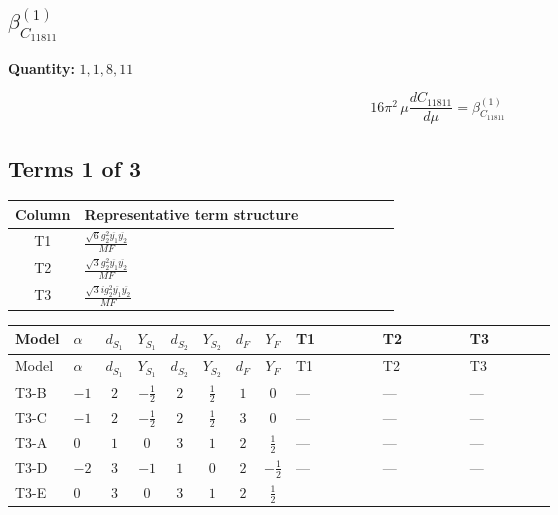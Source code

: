 \documentclass[8pt]{article}
\begin{document}
\begin{landscape}
\section*{$\beta_{C_{11811}}^{(1)}$}
\noindent\textbf{Quantity: }$\mathrm{1,1,8,11}$\par\smallskip
\[16\pi^2\,\mu\frac{d C_{11811}}{d\mu}=\beta_{C_{11811}}^{(1)}\]
\subsection*{Terms 1 of 3}
\begin{center}
\begin{tabular}{@{}c >{\raggedright\arraybackslash}p{0.82\linewidth}@{}}
\toprule
Column & Representative term structure \\
\midrule
T1 & \(\displaystyle \frac{\sqrt{6} g_{2}^{2} \overline{y_{1}} \overline{y_{2}}}{MF}\) \\
\midrule
T2 & \(\displaystyle \frac{\sqrt{3} g_{2}^{2} \overline{y_{1}} \overline{y_{2}}}{MF}\) \\
\midrule
T3 & \(\displaystyle \frac{\sqrt{3} i g_{2}^{2} \overline{y_{1}} \overline{y_{2}}}{MF}\) \\
\midrule
\bottomrule
\end{tabular}
\end{center}
\smallskip
\tiny
\begin{longtable}{@{}llcccccc >{\raggedright\arraybackslash}p{0.21\linewidth} >{\raggedright\arraybackslash}p{0.21\linewidth} >{\raggedright\arraybackslash}p{0.21\linewidth}@{}}
\toprule
Model & $\alpha$ & $d_{S_1}$ & $Y_{S_1}$ & $d_{S_2}$ & $Y_{S_2}$ & $d_F$ & $Y_F$ & T1 & T2 & T3 \\
\midrule
\endfirsthead
\toprule
Model & $\alpha$ & $d_{S_1}$ & $Y_{S_1}$ & $d_{S_2}$ & $Y_{S_2}$ & $d_F$ & $Y_F$ & T1 & T2 & T3 \\
\midrule
\endhead
T3-B & $-1$ & $2$ & $-\frac{1}{2}$ & $2$ & $\frac{1}{2}$ & $1$ & $0$ & --- & --- & --- \\
\midrule
T3-C & $-1$ & $2$ & $-\frac{1}{2}$ & $2$ & $\frac{1}{2}$ & $3$ & $0$ & --- & --- & --- \\
\midrule
T3-A & $0$ & $1$ & $0$ & $3$ & $1$ & $2$ & $\frac{1}{2}$ & --- & --- & --- \\
\midrule
T3-D & $-2$ & $3$ & $-1$ & $1$ & $0$ & $2$ & $-\frac{1}{2}$ & --- & --- & --- \\
\midrule
T3-E & $0$ & $3$ & $0$ & $3$ & $1$ & $2$ & $\frac{1}{2}$ & \scriptsize\adjustbox{max width=\linewidth}{$\begin{gathered} \frac{\sqrt{6} g_{2}^{2} \overline{y_{1}} \overline{y_{2}}}{3 MF}\end{gathered}$} & \scriptsize\adjustbox{max width=\linewidth}{$\begin{gathered} \frac{\sqrt{3} g_{2}^{2} \overline{y_{1}} \overline{y_{2}}}{6 MF}\end{gathered}$} & \scriptsize\adjustbox{max width=\linewidth}{$\begin{gathered} - \frac{49 \sqrt{3} i g_{2}^{2} \overline{y_{1}} \overline{y_{2}}}{24 MF}\end{gathered}$} \\

\end{longtable}
\end{landscape}
\end{document}
